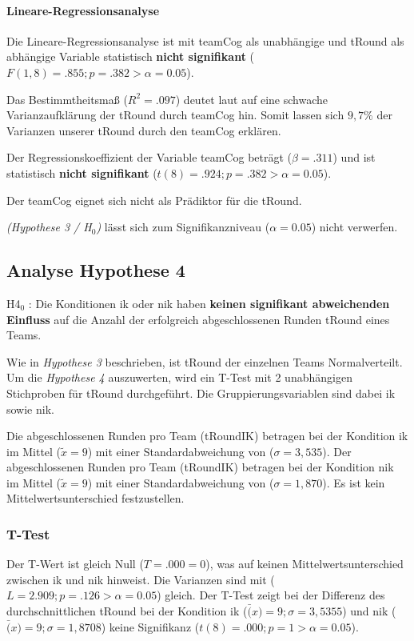 \documentclass[a4paper,11pt]{article}%
\renewcommand{\\}{\vspace*{0.5\baselineskip} \newline}
\begin{document}
			\paragraph{Lineare-Regressionsanalyse}
Die Lineare-Regressionsanalyse ist mit \ac{teamCog} als unabhängige und \ac{tRound} als abhängige Variable statistisch \textbf{nicht signifikant} ($F(1,8) = .855; p = .382 > \alpha = 0.05$).

Das Bestimmtheitsmaß ($R^{2} = .097$) deutet laut \citep{cohen2013statistical} auf eine schwache Varianzaufklärung der \ac{tRound} durch \ac{teamCog} hin. Somit lassen sich $9,7\%$ der Varianzen unserer \ac{tRound} durch den \ac{teamCog} erklären.

Der Regressionskoeffizient der Variable \ac{teamCog} beträgt ($\beta = .311$) und ist statistisch \textbf{nicht signifikant} ($t(8) = .924; p = .382 > \alpha = 0.05$).

Der \ac{teamCog} eignet sich nicht als Prädiktor für die \ac{tRound}.

\textit{(Hypothese 3 / H$_{0}$)} lässt sich zum Signifikanzniveau ($\alpha = 0.05$)  nicht verwerfen.
\newpage
	\subsection{Analyse Hypothese 4}
H4$_{0}$ : Die Konditionen \ac{ik} oder \ac{nik} haben \textbf{keinen signifikant abweichenden Einfluss} auf die Anzahl der erfolgreich abgeschlossenen Runden \ac{tRound} eines Teams.

Wie in \textit{Hypothese 3} beschrieben, ist \ac{tRound} der einzelnen Teams Normalverteilt.
Um die  \textit{Hypothese 4} auszuwerten, wird ein T-Test mit 2 unabhängigen Stichproben für \ac{tRound} durchgeführt. Die Gruppierungsvariablen sind dabei \ac{ik} sowie \ac{nik}.

Die abgeschlossenen Runden pro Team (\ac{tRoundIK}) betragen bei der Kondition \ac{ik} im Mittel ($\tilde x = 9$) mit einer Standardabweichung von ($\sigma = 3,535$).\newline 
Der abgeschlossenen Runden pro Team (\ac{tRoundIK}) betragen bei der Kondition \ac{nik} im Mittel ($\tilde x = 9$) mit einer Standardabweichung von ($\sigma = 1,870$). \newline 
Es ist kein Mittelwertsunterschied festzustellen.

		\subsubsection{T-Test}
Der T-Wert ist gleich Null ($T = .000 = 0$), was auf keinen Mittelwertsunterschied zwischen \ac{ik} und \ac{nik} hinweist.
Die Varianzen sind mit ($L= 2.909; p = .126 > \alpha = 0.05$) gleich.
Der T-Test zeigt bei der Differenz des durchschnittlichen \ac{tRound} bei der Kondition \ac{ik} ($\bar(x) = 9; \sigma = 3,5355$) und \ac{nik} ($\bar(x) = 9; \sigma = 1,8708$) keine Signifikanz ($t(8) = .000; p = 1 > \alpha = 0.05$).
\end{document}
